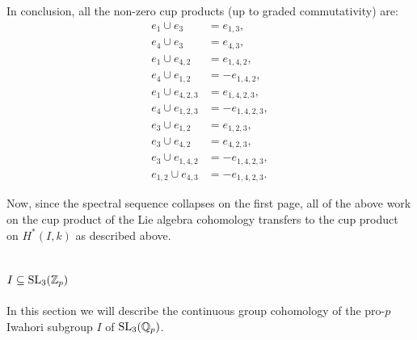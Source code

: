 In conclusion, all the non-zero cup products (up to graded commutativity) are:
\begin{equation}
  \label{eq:cup-products-GL2}
  \begin{aligned}
    e_{1} \cup e_{3} &= e_{1,3}, \\
    e_{4} \cup e_{3} &= e_{4,3}, \\
    e_{1} \cup e_{4,2} &= e_{1,4,2}, \\
    e_{4} \cup e_{1,2} &= -e_{1,4,2}, \\
    e_{1} \cup e_{4,2,3} &= e_{1,4,2,3}, \\
    e_{4} \cup e_{1,2,3} &= -e_{1,4,2,3}, \\
    e_{3} \cup e_{1,2} &= e_{1,2,3}, \\
    e_{3} \cup e_{4,2} &= e_{4,2,3}, \\
    e_{3} \cup e_{1,4,2} &= -e_{1,4,2,3}, \\
    e_{1,2} \cup e_{4,3} &= -e_{1,4,2,3}.
  \end{aligned}
\end{equation}

Now, since the spectral sequence collapses on the first page, all of the above work on the cup product of the Lie algebra cohomology transfers to the cup product on $H^{*}(I,k)$ as described above.

\section{\texorpdfstring{$I \subseteq \operatorname{SL}_{3}(\mathbb{Z}_{p})$}{I in SL3(Zp)}}%
\label{sec:Iwa-SL3}

In this section we will describe the continuous group cohomology of the pro-$p$ Iwahori subgroup $I$ of $\operatorname{SL}_{3}(\mathbb{Q}_{p})$.


